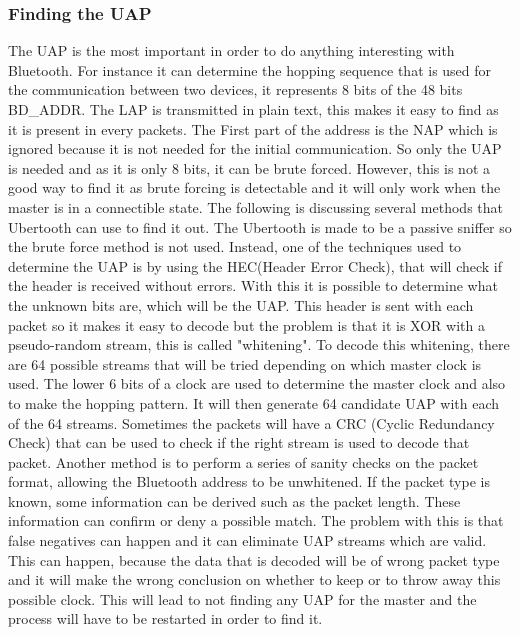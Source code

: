 \subsubsection{Finding the UAP}
\label{subsubsec:finding_uap}
The UAP is the most important in order to do anything interesting with Bluetooth. For instance it can determine the hopping sequence that is used for the communication between two devices, it represents 8 bits of the 48 bits BD\_ADDR. The LAP is transmitted in plain text, this makes it easy to find as it is present in every packets. The First part of the address is the NAP which is ignored because it is not needed for the initial communication. So only the UAP is needed and as it is only 8 bits, it can be brute forced. However, this is not a good way to find it as brute forcing is detectable and it will only work when the master is in a connectible state. The following is discussing several methods that Ubertooth can use to find it out.\pend
The Ubertooth is made to be a passive sniffer so the brute force method is not used. Instead, one of the techniques used to determine the UAP is by using the HEC(Header Error Check), that will check if the header is received without errors. With this it is possible to determine what the unknown bits are, which will be the UAP. This header is sent with each packet so it makes it easy to decode but the problem is that it is XOR with a pseudo-random stream, this is called "whitening". 
To decode this whitening, there are 64 possible streams that will be tried depending on which master clock is used. 
\newpage
\noindent The lower 6 bits of a clock are used to determine the master clock and also to make the hopping pattern. It will then generate 64 candidate UAP with each of the 64 streams. Sometimes the packets will have a CRC (Cyclic Redundancy Check) that can be used to check if the right stream is used to decode that packet. \pend
Another method is to perform a series of sanity checks on the packet format, allowing the Bluetooth address to be unwhitened. If the packet type is known, some information can be derived such as the packet length. These information can confirm or deny a possible match. The problem with this is that false negatives can happen and it can eliminate UAP streams which are valid. This can happen, because the data that is decoded will be of wrong packet type and it will make the wrong conclusion on whether to keep or to throw away this possible clock. This will lead to not finding any UAP for the master and the process will have to be restarted in order to find it. \pend